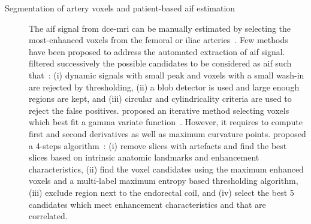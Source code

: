 \begin{description}
  \item[Segmentation of artery voxels and patient-based \ac{aif} estimation] The \ac{aif} signal from \ac{dce}-\ac{mri} can be manually estimated by selecting the most-enhanced voxels from the femoral or iliac arteries~\citep{meng2010comparison}.
    Few methods have been proposed to address the automated extraction of \ac{aif} signal.
    \citeauthor{chen2008automatic} filtered successively the possible candidates to be considered as \ac{aif} such that~\citep{chen2008automatic}:
    (i) dynamic signals with small peak and voxels with a small wash-in are rejected by thresholding,
    (ii) a blob detector is used and large enough regions are kept, and
    (iii) circular and cylindricality criteria are used to reject the false positives.
    \citeauthor{zhu2011automated} proposed an iterative method selecting voxels which best fit a gamma variate function~\citep{zhu2011automated}.
    However, it requires to compute first and second derivatives as well as maximum curvature points.
    \citeauthor{shanbhag2012generalized} proposed a 4-steps algorithm~\citep{shanbhag2012generalized,fennessy2015quantitative}:
    (i) remove slices with artefacts and find the best slices based on intrinsic anatomic landmarks and enhancement characteristics,
    (ii) find the voxel candidates using the maximum enhanced voxels and a multi-label maximum entropy based thresholding algorithm,
    (iii) exclude region next to the endorectal coil, and
    (iv) select the best 5 candidates which meet enhancement characteristics and that are correlated.


\end{description}

